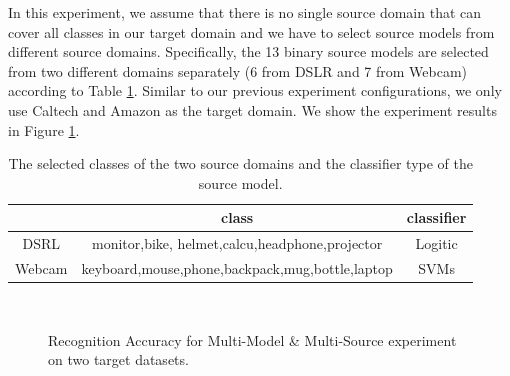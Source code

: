 In this experiment, we assume that there is no single source domain that can cover all classes in our target domain and we have to select source models from different source domains. Specifically, the 13 binary source models are selected from two different domains separately (6 from DSLR and 7 from Webcam) according to Table \ref{tab:class_gen}. Similar to our previous experiment configurations, we only use Caltech and Amazon as the target domain. We show the experiment results in Figure \ref{fig:exp2}.
\begin{table}[htbp]
	\centering
	\caption{The selected classes of the two source domains and the classifier type of the source model.}
	\begin{tabular}{|c|c|c|}
		\hline
		& class & classifier\\
		\hline
		DSRL& monitor,bike, helmet,calcu,headphone,projector & Logitic\\\hline
		Webcam&keyboard,mouse,phone,backpack,mug,bottle,laptop&SVMs\\ \hline
		
	\end{tabular}%
	\label{tab:class_gen}%
\end{table}%
\begin{figure}[th]
	\centering
	\qquad\qquad
	\\
	\caption{Recognition Accuracy for Multi-Model \& Multi-Source experiment on two target datasets. }
	\label{fig:exp2}
\end{figure}

